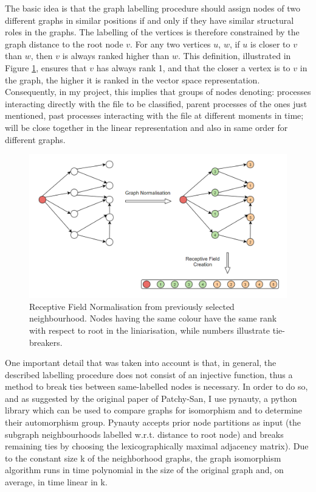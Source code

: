 The basic idea is that the graph labelling procedure should assign nodes of two different graphs in similar positions if and only if they have similar structural roles in the graphs. The labelling of the vertices is therefore constrained by the graph distance to the root node $v$. For any two vertices $u$, $w$, if $u$ is closer to $v$ than $w$, then $v$ is
always ranked higher than $w$. This definition, illustrated in Figure \ref{normalisation}, ensures that $v$ has always rank 1, and that the closer a vertex is to $v$ in the graph, the higher it is ranked in the vector space representation. Consequently, in my project, this implies that groups of nodes denoting: processes interacting directly with the file to be classified, parent processes of the ones just mentioned, past processes interacting with the file at different moments in time; will be close together in the linear representation and also in same order for different graphs.\\

\begin{figure}[H]
  \centering
  \includegraphics[scale=0.55]{Images/normalisation.png}
  \caption{Receptive Field Normalisation from previously selected neighbourhood. Nodes having the same colour have the same rank with respect to root in the liniarisation, while numbers illustrate tie-breakers.}
  \label{normalisation}
\end{figure}

One important detail that was taken into account is that, in general, the described labelling procedure does not consist of an injective function, thus a method to break ties between same-labelled nodes is necessary. In order to do so, and as suggested by the original paper of Patchy-San, I use pynauty, a python library which can be used to compare graphs for isomorphism and to determine their automorphism group. Pynauty accepts prior node partitions as input (the subgraph neighbourhoods labelled w.r.t. distance to root node) and breaks remaining ties by choosing the lexicographically maximal adjacency matrix). Due to the constant size k of the neighborhood graphs, the graph isomorphism algorithm runs in time polynomial in the size of the original graph and, on average, in time linear in k. \\ 

